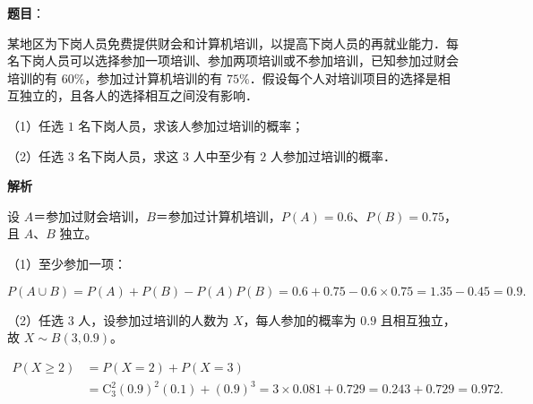 \begin{answer}

\textbf{题目}：

某地区为下岗人员免费提供财会和计算机培训，以提高下岗人员的再就业能力．每名下岗人员可以选择参加一项培训、参加两项培训或不参加培训，已知参加过财会培训的有 $60\%$，参加过计算机培训的有 $75\%$．假设每个人对培训项目的选择是相互独立的，且各人的选择相互之间没有影响．

（1）任选 $1$ 名下岗人员，求该人参加过培训的概率；

（2）任选 $3$ 名下岗人员，求这 $3$ 人中至少有 $2$ 人参加过培训的概率．

\textbf{解析}

设 $A$＝参加过财会培训，$B$＝参加过计算机培训，$P(A)=0.6$、$P(B)=0.75$，且 $A$、$B$ 独立。

（1）至少参加一项：

\nopagebreak[4]
\[P(A\cup B)=P(A)+P(B)-P(A)P(B)=0.6+0.75-0.6\times0.75=1.35-0.45=0.9 .\]

（2）任选 $3$ 人，设参加过培训的人数为 $X$，每人参加的概率为 $0.9$ 且相互独立，故 $X\sim B(3,0.9)$。

\nopagebreak[4]
\[
\begin{aligned}
P(X\geqslant2)&=P(X=2)+P(X=3)\\
&=\mathrm C_3^2(0.9)^2(0.1)+(0.9)^3
=3\times0.081+0.729=0.243+0.729=0.972 .
\end{aligned}
\]


\end{answer}
